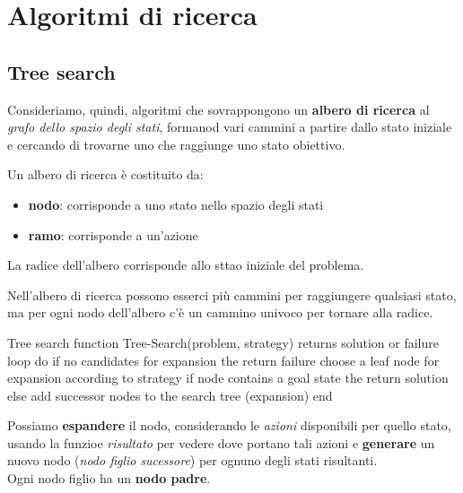\documentclass[12pt, a4paper, oneside]{book}
\begin{document}

    \section{Algoritmi di ricerca}

    \subsection{Tree search}
    Consideriamo, quindi, algoritmi che sovrappongono un \textbf{albero di ricerca} al \textit{grafo dello spazio degli stati}, formanod vari cammini a partire dallo stato iniziale e cercando di trovarne uno che raggiunge uno stato obiettivo. 

    Un albero di ricerca è costituito da:
    \begin{itemize}
      \item \textbf{nodo}: corrisponde a uno stato nello spazio degli stati
      \item \textbf{ramo}: corrisponde a un'azione
    \end{itemize}

    La radice dell'albero corrisponde allo sttao iniziale del problema.

    Nell'albero di ricerca possono esserci più cammini per raggiungere qualsiasi stato, ma per ogni nodo dell'albero c'è un cammino univoco per tornare alla radice.

    \begin{codice}[python]{Tree search}
      function Tree-Search(problem, strategy) returns solution or failure
        loop do
          if no candidates for expansion the return failure
            choose a leaf node for expansion according to strategy
          if node contains a goal state the return solution
          else add successor nodes to the search tree (expansion)
        end
    \end{codice}

    Possiamo \textbf{espandere} il nodo, considerando le \textit{azioni} disponibili per quello stato, usando la funzioe \textit{risultato} per vedere dove portano tali azioni e \textbf{generare} un nuovo nodo (\textit{nodo figlio} \textit{sucessore}) per ognuno degli stati risultanti. \\[0.5ex]
    Ogni nodo figlio ha un \textbf{nodo padre}.
\end{document}
